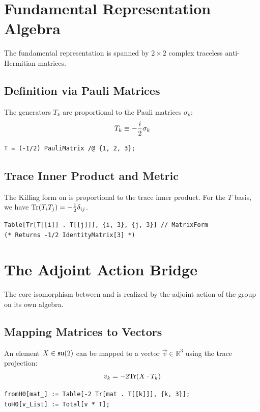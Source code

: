 \section{Fundamental Representation Algebra}
The fundamental representation  is spanned by $2\times 2$ complex traceless anti-Hermitian matrices.

\subsection{Definition via Pauli Matrices}
The generators $T_k$ are proportional to the Pauli matrices $\sigma_k$:
\begin{equation*}
    T_k \mathrel{\equiv} -\frac{i}{2}\sigma_k
\end{equation*}

\begin{Verbatim}[frame=single, label=Mathematica]
T = (-I/2) PauliMatrix /@ {1, 2, 3};
\end{Verbatim}

\subsection{Trace Inner Product and Metric}
The Killing form on  is proportional to the trace inner product. For the $T$ basis, we have $\mathrm{Tr}(T_i T_j) = -\frac{1}{2}\delta_{ij}$.

\begin{Verbatim}[frame=single, label=Mathematica]
Table[Tr[T[[i]] . T[[j]]], {i, 3}, {j, 3}] // MatrixForm
(* Returns -1/2 IdentityMatrix[3] *)
\end{Verbatim}

\section{The Adjoint Action Bridge}
The core isomorphism between  and  is realized by the adjoint action of the group on its own algebra.

\subsection{Mapping Matrices to Vectors}
An element $X \in \mathfrak{su}(2)$ can be mapped to a vector $\vec{v} \in \mathbb{R}^3$ using the trace projection:
\begin{equation*}
    v_k = -2 \mathrm{Tr}(X \cdot T_k)
\end{equation*}

\begin{Verbatim}[frame=single, label=Mathematica]
fromH0[mat_] := Table[-2 Tr[mat . T[[k]]], {k, 3}];
toH0[v_List] := Total[v * T];
\end{Verbatim}

